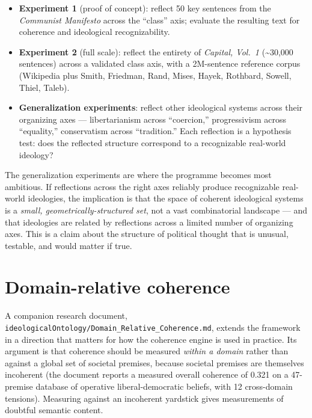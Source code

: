 \documentclass[11pt,letterpaper]{article}
\newcommand{\file}[1]{\texttt{#1}}
\begin{document}
\begin{itemize}[leftmargin=1.5em,itemsep=0.15em]
\item \textbf{Experiment 1} (proof of concept): reflect 50 key sentences from the \textit{Communist Manifesto} across the ``class'' axis; evaluate the resulting text for coherence and ideological recognizability.
\item \textbf{Experiment 2} (full scale): reflect the entirety of \textit{Capital, Vol.~1} (\textasciitilde30,000 sentences) across a validated class axis, with a 2M-sentence reference corpus (Wikipedia plus Smith, Friedman, Rand, Mises, Hayek, Rothbard, Sowell, Thiel, Taleb).
\item \textbf{Generalization experiments}: reflect other ideological systems across their organizing axes --- libertarianism across ``coercion,'' progressivism across ``equality,'' conservatism across ``tradition.'' Each reflection is a hypothesis test: does the reflected structure correspond to a recognizable real-world ideology?
\end{itemize}

The generalization experiments are where the programme becomes most ambitious. If reflections across the right axes reliably produce recognizable real-world ideologies, the implication is that the space of coherent ideological systems is a \emph{small, geometrically-structured set}, not a vast combinatorial landscape --- and that ideologies are related by reflections across a limited number of organizing axes. This is a claim about the structure of political thought that is unusual, testable, and would matter if true.

\section{Domain-relative coherence}

A companion research document, \file{ideologicalOntology/Domain\_Relative\_Coherence.md}, extends the framework in a direction that matters for how the coherence engine is used in practice. Its argument is that coherence should be measured \emph{within a domain} rather than against a global set of societal premises, because societal premises are themselves incoherent (the document reports a measured overall coherence of 0.321 on a 47-premise database of operative liberal-democratic beliefs, with 12 cross-domain tensions). Measuring against an incoherent yardstick gives measurements of doubtful semantic content.
\end{document}
